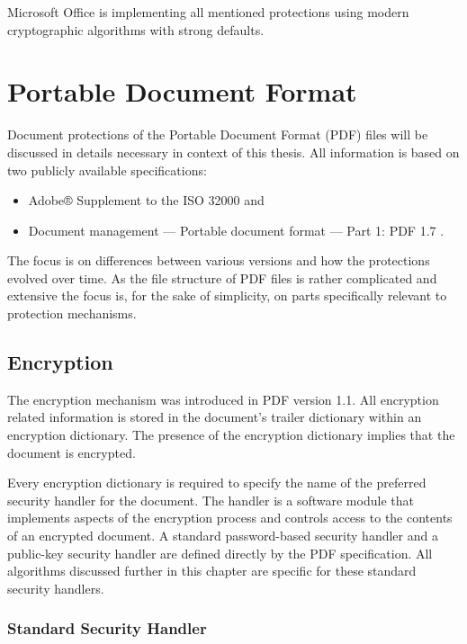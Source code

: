 \documentclass[11pt,oneside]{fithesis2}
\begin{document}
Microsoft Office is implementing all mentioned protections using modern cryptographic algorithms with strong defaults. 

\chapter{Portable Document Format}

Document protections of the Portable Document Format (PDF) files will be discussed in details necessary in context of this thesis. All information is based on two publicly available specifications:

\begin{itemize}
\setlength\itemsep{0.1em}
\item{Adobe® Supplement to the ISO 32000 \cite{iso32000sup} and}
\item{Document management — Portable document format — Part 1: PDF 1.7 \cite{pdf_spec}.}
\end{itemize}

The focus is on differences between various versions and how the protections evolved over time. As the file structure of PDF files is rather complicated and extensive the focus is, for the sake of simplicity, on parts specifically relevant to protection mechanisms.

\section{Encryption}

The encryption mechanism was introduced in PDF version 1.1. All encryption related information is stored in the document's trailer dictionary \cite[p. 42]{pdf_spec} within an encryption dictionary. The presence of the encryption dictionary implies that the document is encrypted.

Every encryption dictionary is required to specify the name of the preferred security handler for the document. The handler is a software module that implements aspects of the encryption process and controls access to the contents of an encrypted document. A standard password-based security handler and a public-key security handler are defined directly by the PDF specification. All algorithms discussed further in this chapter are specific for these standard security handlers.

\subsection{Standard Security Handler}\label{pdf_enc}
\end{document}
